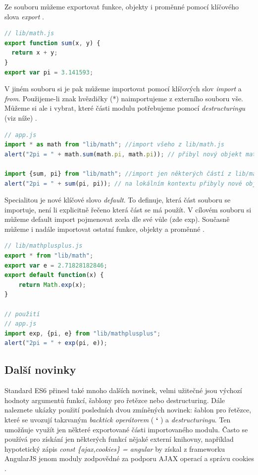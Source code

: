 \vspace{3mm}
Ze souboru můžeme exportovat funkce, objekty i proměnné pomocí klíčového slova \textit{export} \cite{es6}.
\begin{lstlisting}[language=Javascript,caption={Deklarace modulu v ES6 Javascriptu \cite{es6}}]
// lib/math.js
export function sum(x, y) {
  return x + y;
}
export var pi = 3.141593;
\end{lstlisting}

V jiném souboru si je pak můžeme importovat pomocí klíčových slov \textit{import} a \textit{from}. Použijeme-li znak hvězdičky (*) naimportujeme z externího souboru vše. Můžeme si ale i vybrat, které části modulu potřebujeme pomocí \textit{destructuringu} (viz níže) \cite{exploring_es6} \cite{es6} \cite{es6_book}.
\begin{lstlisting}[language=Javascript,caption={Použití modulu v ES6 Javascriptu \cite{es6}}]
// app.js
import * as math from "lib/math"; //import všeho z lib/math.js
alert("2pi = " + math.sum(math.pi, math.pi)); // přibyl nový objekt math

import {sum, pi} from "lib/math"; //import jen některých částí z lib/math.js
alert("2pi = " + sum(pi, pi)); // na lokálním kontextu přibyly nové objekty sum a pi
\end{lstlisting}
Specialitou je nové klíčové slovo \textit{default}. To definuje, která část souboru se importuje, není li explicitně řečeno která část se má použít. V cílovém souboru si můžeme default import pojmenovat zcela dle své vůle (zde exp). Současně můžeme i nadále importovat ostatní funkce, objekty a proměnné \cite{exploring_es6} \cite{es6} \cite{es6_book}.
\begin{lstlisting}[language=Javascript,caption={Použití modulu s klíčovým slovem default v ES6 Javascriptu \cite{es6}}]
// lib/mathplusplus.js
export * from "lib/math";
export var e = 2.71828182846;
export default function(x) {
    return Math.exp(x);
}

// použití
// app.js
import exp, {pi, e} from "lib/mathplusplus";
alert("2pi = " + exp(pi, e));
\end{lstlisting}

\subsection{Další novinky}
Standard ES6 přinesl také mnoho dalších novinek, velmi užitečné jsou výchozí hodnoty argumentů funkcí, šablony pro řetězce nebo destructuring. Dále naleznete ukázky použití posledních dvou zmíněných novinek: šablon pro řetězce, které se uvozují takzvaným \textit{backtick operátorem} ( {\large \textbf{`}} ) a \textit{destructuringu}. Ten umožňuje využít jen některé exportované části importovaného modulu. Často se používá pro získání jen některých funkcí nějaké externí knihovny, například hypotetický zápis \textit{const \{ajax,cookies\} = angular} by získal z frameworku AngularJS jenom moduly zodpovědné za podporu AJAX operací a správu cookies \cite{exploring_es6} \cite{es6} \cite{es6_book}.


